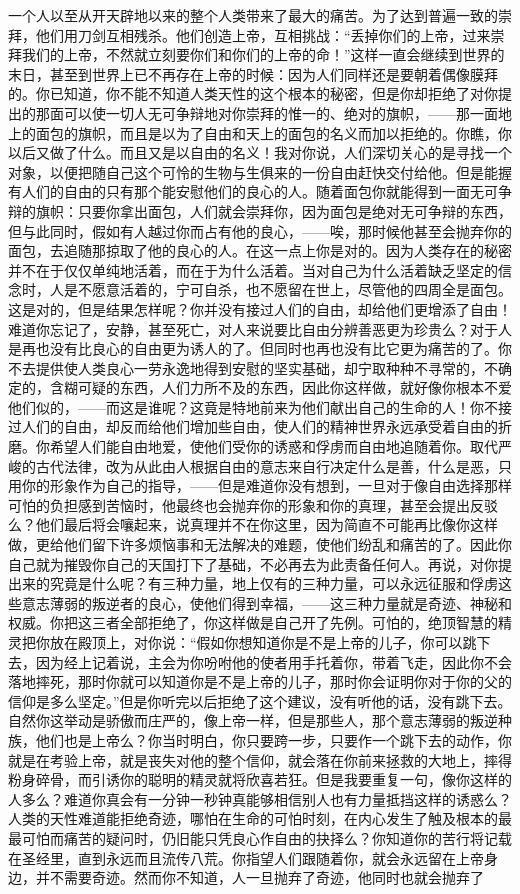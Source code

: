 一个人以至从开天辟地以来的整个人类带来了最大的痛苦。为了达到普遍一致的崇拜，他们用刀剑互相残杀。他们创造上帝，互相挑战：“丢掉你们的上帝，过来崇拜我们的上帝，不然就立刻要你们和你们的上帝的命！”这样一直会继续到世界的末日，甚至到世界上已不再存在上帝的时候：因为人们同样还是要朝着偶像膜拜的。你已知道，你不能不知道人类天性的这个根本的秘密，但是你却拒绝了对你提出的那面可以使一切人无可争辩地对你崇拜的惟一的、绝对的旗帜，——那一面地上的面包的旗帜，而且是以为了自由和天上的面包的名义而加以拒绝的。你瞧，你以后又做了什么。而且又是以自由的名义！我对你说，人们深切关心的是寻找一个对象，以便把随自己这个可怜的生物与生俱来的一份自由赶快交付给他。但是能握有人们的自由的只有那个能安慰他们的良心的人。随着面包你就能得到一面无可争辩的旗帜：只要你拿出面包，人们就会崇拜你，因为面包是绝对无可争辩的东西，但与此同时，假如有人越过你而占有他的良心，——唉，那时候他甚至会抛弃你的面包，去追随那掠取了他的良心的人。在这一点上你是对的。因为人类存在的秘密并不在于仅仅单纯地活着，而在于为什么活着。当对自己为什么活着缺乏坚定的信念时，人是不愿意活着的，宁可自杀，也不愿留在世上，尽管他的四周全是面包。这是对的，但是结果怎样呢？你并没有接过人们的自由，却给他们更增添了自由！难道你忘记了，安静，甚至死亡，对人来说要比自由分辨善恶更为珍贵么？对于人是再也没有比良心的自由更为诱人的了。但同时也再也没有比它更为痛苦的了。你不去提供使人类良心一劳永逸地得到安慰的坚实基础，却宁取种种不寻常的，不确定的，含糊可疑的东西，人们力所不及的东西，因此你这样做，就好像你根本不爱他们似的，——而这是谁呢？这竟是特地前来为他们献出自己的生命的人！你不接过人们的自由，却反而给他们增加些自由，使人们的精神世界永远承受着自由的折磨。你希望人们能自由地爱，使他们受你的诱惑和俘虏而自由地追随着你。取代严峻的古代法律，改为从此由人根据自由的意志来自行决定什么是善，什么是恶，只用你的形象作为自己的指导，——但是难道你没有想到，一旦对于像自由选择那样可怕的负担感到苦恼时，他最终也会抛弃你的形象和你的真理，甚至会提出反驳么？他们最后将会嚷起来，说真理并不在你这里，因为简直不可能再比像你这样做，更给他们留下许多烦恼事和无法解决的难题，使他们纷乱和痛苦的了。因此你自己就为摧毁你自己的天国打下了基础，不必再去为此责备任何人。再说，对你提出来的究竟是什么呢？有三种力量，地上仅有的三种力量，可以永远征服和俘虏这些意志薄弱的叛逆者的良心，使他们得到幸福，——这三种力量就是奇迹、神秘和权威。你把这三者全部拒绝了，你这样做是自己开了先例。可怕的，绝顶智慧的精灵把你放在殿顶上，对你说：“假如你想知道你是不是上帝的儿子，你可以跳下去，因为经上记着说，主会为你吩咐他的使者用手托着你，带着飞走，因此你不会落地摔死，那时你就可以知道你是不是上帝的儿子，那时你会证明你对于你的父的信仰是多么坚定。”但是你听完以后拒绝了这个建议，没有听他的话，没有跳下去。自然你这举动是骄傲而庄严的，像上帝一样，但是那些人，那个意志薄弱的叛逆种族，他们也是上帝么？你当时明白，你只要跨一步，只要作一个跳下去的动作，你就是在考验上帝，就是丧失对他的整个信仰，就会落在你前来拯救的大地上，摔得粉身碎骨，而引诱你的聪明的精灵就将欣喜若狂。但是我要重复一句，像你这样的人多么？难道你真会有一分钟一秒钟真能够相信别人也有力量抵挡这样的诱惑么？人类的天性难道能拒绝奇迹，哪怕在生命的可怕时刻，在内心发生了触及根本的最最可怕而痛苦的疑问时，仍旧能只凭良心作自由的抉择么？你知道你的苦行将记载在圣经里，直到永远而且流传八荒。你指望人们跟随着你，就会永远留在上帝身边，并不需要奇迹。然而你不知道，人一旦抛弃了奇迹，他同时也就会抛弃了